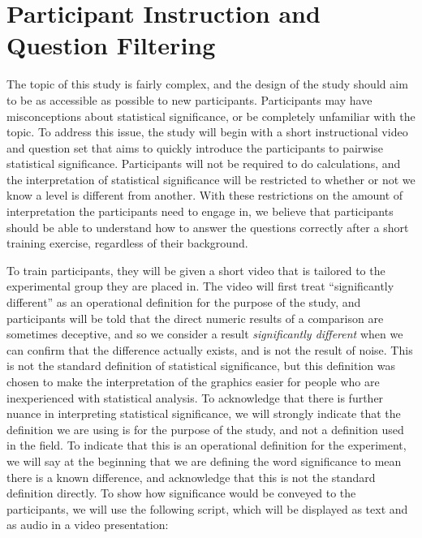 \documentclass{article}
\begin{document}
\section{Participant Instruction and Question Filtering}

The topic of this study is fairly complex, and the design of the study should aim to be as accessible as possible to new participants. Participants may have misconceptions about statistical significance, or be completely unfamiliar with the topic. To address this issue, the study will begin with a short instructional video and question set that aims to quickly introduce the participants to pairwise statistical significance. Participants will not be required to do calculations, and the interpretation of statistical significance will be restricted to whether or not we know a level is different from another. With these restrictions on the amount of interpretation the participants need to engage in, we believe that participants should be able to understand how to answer the questions correctly after a short training exercise, regardless of their background. 

To train participants, they will be given a short video that is tailored to the experimental group they are placed in. The video will first treat ``significantly different'' as an operational definition for the purpose of the study, and participants will be told that the direct numeric results of a comparison are sometimes deceptive, and so we consider a result \emph{significantly different} when we can confirm that the difference actually exists, and is not the result of noise. This is not the standard definition of statistical significance, but this definition was chosen to make the interpretation of the graphics easier for people who are inexperienced with statistical analysis. To acknowledge that there is further nuance in interpreting statistical significance, we will strongly indicate that the definition we are using is for the purpose of the study, and not a definition used in the field. To indicate that this is an operational definition for the experiment, we will say at the beginning that we are defining the word significance to mean there is a known difference, and acknowledge that this is not the standard definition directly. To show how significance would be conveyed to the participants, we will use the following script, which will be displayed as text and as audio in a video presentation:
\end{document}
